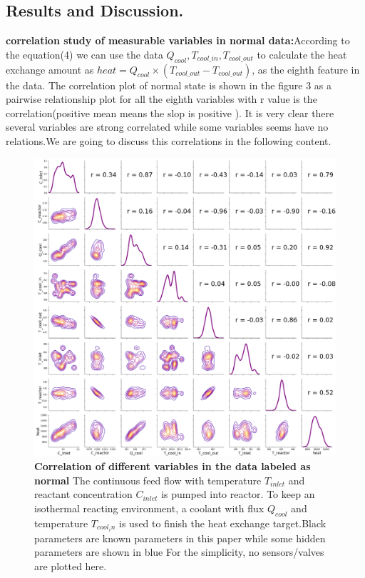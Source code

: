 \documentclass[fleqn,11pt]{wlscirep}
\begin{document}
\subsection*{Results and Discussion.}
\textbf{correlation study of measurable variables in normal data:}According to the equation(4) we can use the data $ Q_{cool}, T_{cool\_in},T_{cool\_out}$ to calculate the heat exchange amount as $heat =Q_{cool}\times( T_{cool\_out}-T_{cool\_out})$, as the eighth feature in the  data. The correlation plot of normal state is shown in the figure 3 as a  pairwise relationship plot for all the eighth variables with r value is the correlation(positive mean means the slop is positive ). It is very clear there several variables are strong correlated while some  variables seems have no relations.We are going to discuss this correlations in the following content.
\begin{figure}[h]
    \centering
    \includegraphics[width=13cm]{figure3.png}
    \caption{
    \textbf{Correlation of different variables in the data labeled as normal  } The continuous feed flow with temperature $T_{inlet}$ and reactant concentration $C_{inlet}$ is pumped into reactor. To keep an isothermal reacting environment, a coolant with flux $Q_{cool}$ and temperature $T_{cool_in} $ is used to finish the heat exchange target.Black parameters are known parameters in this paper while some hidden parameters  are shown in blue For the simplicity, no sensors/valves are plotted here.}
    \label{fig:1}
\end{figure}
\end{document}
